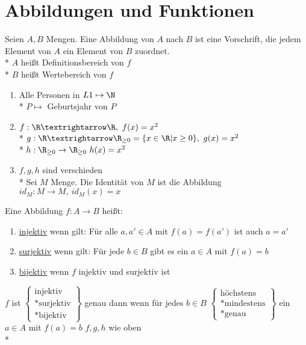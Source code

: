 %
\chapter{Abbildungen und Funktionen}
Seien $A, B$ Mengen. Eine Abbildung von $A$ nach $B$ ist eine Vorschrift, die jedem Element von $A$ ein Element von $B$ zuordnet.\\*
%
$A$ heißt Definitionsbereich von $f$\\*
$B$ heißt Wertebereich von $f$
%
\bsp
\begin{enumerate}
\item {Alle Personen in $L1 \mapsto \N$\\*
$P \mapsto$ Geburtsjahr von $P$}
%
\item{$f:\R → \R, \ f(x)=x^2$\\*
$g:\R→\R_{\geq 0}=\{x\in\R|x\geq 0\}, \ g(x)=x^2$\\*
$h: \R_{\geq 0} \to \R_{\geq 0} \ h(x) = x^2$}
\bem 
\item{
$f,g,h$ sind verschieden\\*
Sei $M$ Menge. Die Identität von $M$ ist die Abbildung $id_{M}:M→M, \ id_M(x)=x$}
\end{enumerate}
%
%
Eine Abbildung $f: A \to B$ heißt:
%
\begin{enumerate}
\item{\ul{injektiv} wenn gilt: Für alle $a, a' \in A$ mit $f(a) = f(a')$ ist auch $a = a'$}
\item{\ul{surjektiv} wenn gilt: Für jede $b\in B$ gibt es ein $a\in A$ mit $f(a)=b$}
\item{\ul{bijektiv} wenn $f$ injektiv und surjektiv ist}
\end{enumerate}
%
%
%
\bem
$f$ ist $\left\{
\begin{array}{c}
\text{injektiv}\\*
\text{surjektiv}\\*
\text{bijektiv}
\end{array}
 \right\}$ genau dann wenn für jedes $b \in B$ $\left\{\begin{array}{c} \text{höchstens}\\* \text{mindestens}\\*
 \text{genau}
 \end{array} \right\}$ ein $a \in A$ mit $f(a) = b$
%
\bsp
$f,g,h$ wie oben\\*

